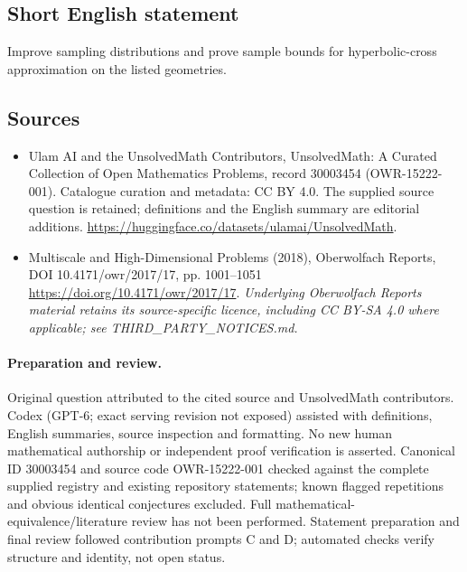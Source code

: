 \documentclass[11pt]{article}
\begin{document}
\subsection{Short English statement}
Improve sampling distributions and prove sample bounds for hyperbolic-cross approximation on the listed geometries.
\subsection{Sources}
\begin{itemize}
\item[\hypertarget{source:30003454:1}{S1}] Ulam AI and the UnsolvedMath Contributors, UnsolvedMath: A Curated Collection of Open Mathematics Problems, record 30003454 (OWR-15222-001). Catalogue curation and metadata: CC BY 4.0. The supplied source question is retained; definitions and the English summary are editorial additions.
\url{https://huggingface.co/datasets/ulamai/UnsolvedMath}.
\item[\hypertarget{source:30003454:2}{S2}] Multiscale and High-Dimensional Problems (2018), Oberwolfach Reports, DOI 10.4171/owr/2017/17, pp. 1001--1051
\url{https://doi.org/10.4171/owr/2017/17}.
\textit{Underlying Oberwolfach Reports material retains its source-specific licence, including CC BY-SA 4.0 where applicable; see THIRD\_PARTY\_NOTICES.md.}
\end{itemize}
\paragraph{Preparation and review.}
Original question attributed to the cited source and UnsolvedMath contributors. Codex (GPT-6; exact serving revision not exposed) assisted with definitions, English summaries, source inspection and formatting. No new human mathematical authorship or independent proof verification is asserted. Canonical ID 30003454 and source code OWR-15222-001 checked against the complete supplied registry and existing repository statements; known flagged repetitions and obvious identical conjectures excluded. Full mathematical-equivalence/literature review has not been performed. Statement preparation and final review followed contribution prompts C and D; automated checks verify structure and identity, not open status.
\label{end:30003454}
\end{document}
